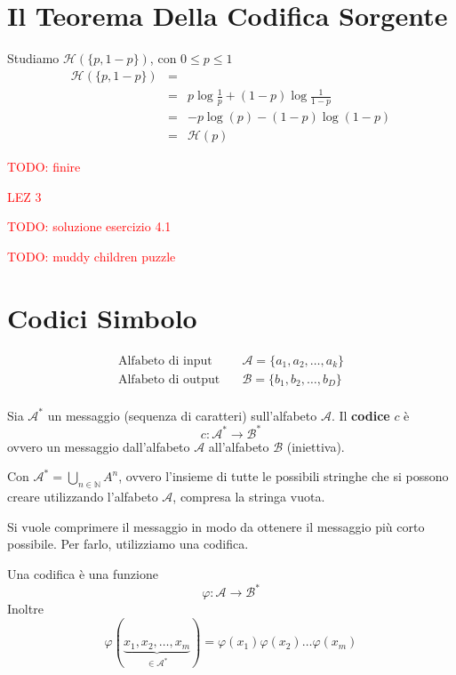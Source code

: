 \section{Il Teorema Della Codifica Sorgente}
Studiamo $\mathcal{H}(\{p,1-p\})$, con $0\leq p\leq 1$
\begin{eqnarray*}
    \mathcal{H}(\{p,1-p\})  & = &\\
                            & = & p\log\frac{1}{p} + (1-p)\log\frac{1}{1-p}\\
                            & = & -p\log(p) - (1-p)\log(1-p)\\
                            & = & \mathcal{H}(p)
\end{eqnarray*}

\textcolor{Red}{TODO: finire}


\textcolor{Red}{LEZ 3}

\textcolor{Red}{TODO: soluzione esercizio 4.1}

\textcolor{Red}{TODO: muddy children puzzle}



\section{Codici Simbolo}

\begin{definition}
    \begin{align*}
        \text{Alfabeto di input} \quad &\mathcal{A}=\{a_1,a_2,\dots,a_k\}\\
        \text{Alfabeto di output} \quad &\mathcal{B}=\{b_1,b_2,\dots,b_D\}\\
    \end{align*}
\end{definition}

\begin{definition}[Codice]
    Sia $\mathcal{A}^*$ un messaggio (sequenza di caratteri) sull'alfabeto $\mathcal{A}$. Il \textbf{codice} $c$ è
    $$
        c:\mathcal{A}^*\to\mathcal{B}^*
    $$
    ovvero un messaggio dall'alfabeto $\mathcal{A}$ all'alfabeto $\mathcal{B}$ (iniettiva).
\end{definition}
Con $\mathcal{A}^*=\bigcup_{n\in\mathbb{N}}A^n$, ovvero l'insieme di tutte le possibili stringhe che si possono creare utilizzando l'alfabeto $\mathcal{A}$, compresa la stringa vuota.\medskip 

Si vuole comprimere il messaggio in modo da ottenere il messaggio più corto possibile. Per farlo, utilizziamo una codifica.
\begin{definition}[Codifica]
    Una codifica è una funzione 
    $$
        \varphi:\mathcal{A}\to\mathcal{B}^*
    $$ 
    Inoltre
    $$
        \varphi(\underbrace{x_1,x_2,\dots,x_m}_{\in\mathcal{A}^*}) = \varphi(x_1)\varphi(x_2)\dots\varphi(x_m)
    $$
\end{definition}

